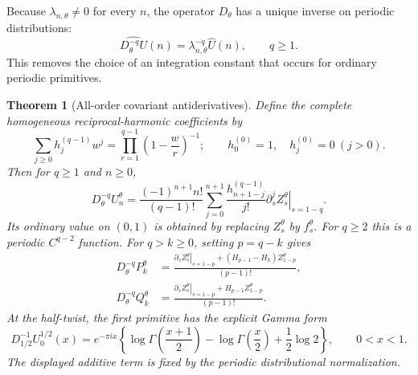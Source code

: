 \documentclass[11pt,letterpaper]{article}
\numberwithin{equation}{section}
\theoremstyle{plain}
\newtheorem{theorem}{Theorem}[section]
\theoremstyle{definition}
\theoremstyle{remark}
\begin{document}
Because $\lambda_{n,\theta}\ne0$ for every $n$, the operator
$D_\theta$ has a unique inverse on periodic distributions:
\[
 \widehat{D_\theta^{-q}U}(n)
       =\lambda_{n,\theta}^{-q}\widehat U(n),\qquad q\ge1.
\]
This removes the choice of an integration constant that occurs
for ordinary periodic primitives.

\begin{theorem}[All-order covariant antiderivatives]
\label{tw:thm:primitives}
Define the complete homogeneous reciprocal-harmonic coefficients by
\begin{equation}\label{tw:eq:hcomplete}
 \sum_{j\ge0}h_j^{(q-1)}w^j
       =\prod_{r=1}^{q-1}\left(1-\frac wr\right)^{-1};
 \qquad h_0^{(0)}=1,\quad h_j^{(0)}=0\ (j>0).
\end{equation}
Then for $q\ge1$ and $n\ge0$,
\begin{equation}\label{tw:eq:primitive}
 D_\theta^{-q}U_n^\theta
 =\frac{(-1)^{n+1}n!}{(q-1)!}
       \sum_{j=0}^{n+1}\frac{h_{n+1-j}^{(q-1)}}{j!}
            \left.\partial_s^j Z_s^\theta\right|_{s=1-q}.
\end{equation}
Its ordinary value on $(0,1)$ is obtained by replacing
$Z_s^\theta$ by $f_s^\theta$. For $q\ge2$ this is a periodic
$C^{q-2}$ function. For $q>k\ge0$, setting $p=q-k$ gives
\begin{align}
 D_\theta^{-q}P_k^\theta
  &=\frac{
       \left.\partial_s Z_s^\theta\right|_{s=1-p}
           +(H_{p-1}-H_k)Z_{1-p}^\theta}{(p-1)!},
       \label{tw:eq:Pprimitive}\\
 D_\theta^{-q}Q_k^\theta
  &=\frac{
       \left.\partial_s Z_s^\theta\right|_{s=1-p}
           +H_{p-1}Z_{1-p}^\theta}{(p-1)!}.
       \label{tw:eq:Qprimitive}
\end{align}
At the half-twist, the first primitive has the explicit Gamma form
\begin{equation}\label{tw:eq:halfGamma}
 D_{1/2}^{-1}U_0^{1/2}(x)
  =e^{-\pi ix}\left\{
      \log\Gamma\left(\frac{x+1}{2}\right)
      -\log\Gamma\left(\frac{x}{2}\right)+\frac12\log2\right\},
 \qquad 0<x<1.
\end{equation}
The displayed additive term is fixed by the periodic distributional
normalization.
\end{theorem}
\end{document}

